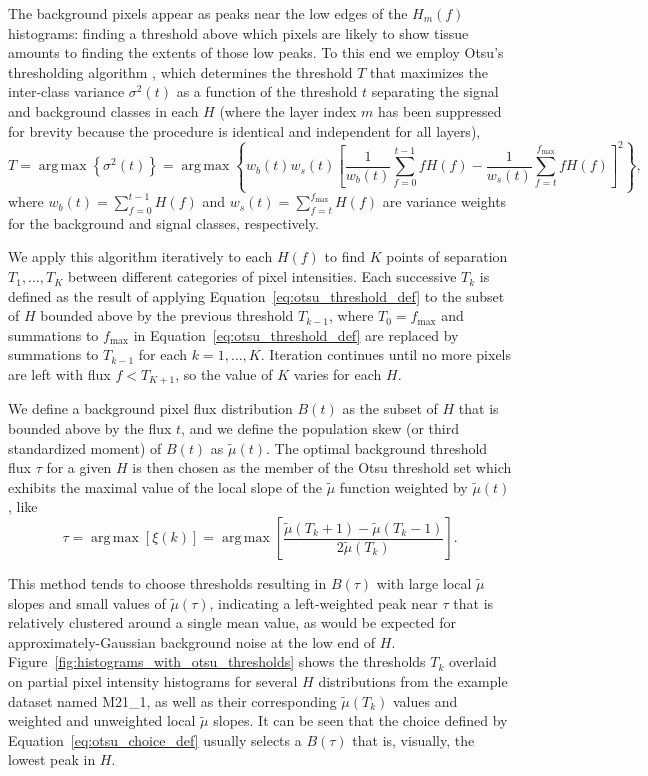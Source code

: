 \documentclass[letterpaper,11pt]{article}
\newcommand{\reffig}[1]{Figure~\ref{#1}}
\newcommand{\refeq}[1]{Equation~\ref{#1}}
\DeclareMathOperator*{\argmax}{arg\,max}
\newcommand{\fmax}{f_{\mathrm{max}}}
\begin{document}
The background pixels appear as peaks near the low edges of the $H_{m}(f)$ histograms: finding a threshold above which pixels are likely to show tissue amounts to finding the extents of those low peaks. To this end we employ Otsu's thresholding algorithm \cite{4310076}, which determines the threshold $T$ that maximizes the inter-class variance $\sigma^2(t)$ as a function of the threshold $t$ separating the signal and background classes in each $H$ (where the layer index $m$ has been suppressed for brevity because the procedure is identical and independent for all layers),
\begin{equation}
T = \argmax{ \left\{ \sigma^2(t) \right\} } = \argmax{ \left\{ w_{b}(t) w_{s}(t) \left[ \frac{1}{w_{b}(t)}\sum_{f=0}^{t-1} f H(f) - \frac{1}{w_{s}(t)}\sum_{f=t}^{\fmax} f H(f) \right]^2 \right\} },
\label{eq:otsu_threshold_def}
\end{equation}  
where $w_{b}(t) = \sum_{f=0}^{t-1} H(f)$ and $w_{s}(t) = \sum_{f=t}^{\fmax} H(f)$ are variance weights for the background and signal classes, respectively.

We apply this algorithm iteratively to each $H(f)$ to find $K$ points of separation $T_{1}, \ldots, T_{K}$ between different categories of pixel intensities. Each successive $T_{k}$ is defined as the result of applying \refeq{eq:otsu_threshold_def} to the subset of $H$ bounded above by the previous threshold $T_{k-1}$, where $T_{0}=\fmax$ and summations to $\fmax$ in \refeq{eq:otsu_threshold_def} are replaced by summations to $T_{k-1}$ for each $k=1,\ldots,K$. Iteration continues until no more pixels are left with flux $f<T_{K+1}$, so the value of $K$ varies for each $H$.

We define a background pixel flux distribution $B(t)$ as the subset of $H$ that is bounded above by the flux $t$, and we define the population skew (or third standardized moment) of $B(t)$ as $\widetilde{\mu}(t)$. The optimal background threshold flux $\tau$ for a given $H$ is then chosen as the member of the Otsu threshold set which exhibits the maximal value of the local slope of the $\widetilde{\mu}$ function weighted by $\widetilde{\mu}(t)$, like
\begin{equation}
\tau = \argmax{\left[ \xi(k) \right]} = \argmax{ \left[ \frac{ \widetilde{\mu}(T_{k}+1) - \widetilde{\mu}(T_{k}-1) }{ 2 \widetilde{\mu}(T_{k}) } \right] } .
\label{eq:otsu_choice_def}
\end{equation}

This method tends to choose thresholds resulting in $B(\tau)$ with large local $\widetilde{\mu}$ slopes and small values of $\widetilde{\mu}(\tau)$, indicating a left-weighted peak near $\tau$ that is relatively clustered around a single mean value, as would be expected for approximately-Gaussian background noise at the low end of $H$. \reffig{fig:histograms_with_otsu_thresholds} shows the thresholds $T_{k}$ overlaid on partial pixel intensity histograms for several $H$ distributions from the example dataset named M21\_1, as well as their corresponding $\widetilde{\mu}(T_{k})$ values and weighted and unweighted local $\widetilde{\mu}$ slopes. It can be seen that the choice defined by \refeq{eq:otsu_choice_def} usually selects a $B(\tau)$ that is, visually, the lowest peak in $H$.
\end{document}

